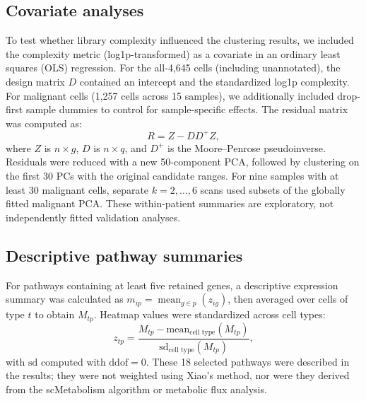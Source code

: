 \subsection{Covariate analyses}
To test whether library complexity influenced the clustering results, we included the complexity metric (log1p-transformed) as a covariate in an ordinary least squares (OLS) regression. For the all-4,645 cells (including unannotated), the design matrix $D$ contained an intercept and the standardized log1p complexity. For malignant cells (1,257 cells across 15 samples), we additionally included drop-first sample dummies to control for sample-specific effects. The residual matrix was computed as:
\begin{equation}
R = Z - D D^{+} Z,
\end{equation}
where $Z$ is $n\times g$, $D$ is $n\times q$, and $D^{+}$ is the Moore--Penrose pseudoinverse. Residuals were reduced with a new 50-component PCA, followed by clustering on the first 30 PCs with the original candidate ranges. For nine samples with at least 30 malignant cells, separate $k=2,\ldots,6$ scans used subsets of the globally fitted malignant PCA. These within-patient summaries are exploratory, not independently fitted validation analyses.

\subsection{Descriptive pathway summaries}
For pathways containing at least five retained genes, a descriptive expression summary was calculated as $m_{ip}=\operatorname{mean}_{g\in p}(z_{ig})$, then averaged over cells of type $t$ to obtain $M_{tp}$. Heatmap values were standardized across cell types:
\begin{equation}
z_{tp} = \frac{M_{tp} - \text{mean}_{\text{cell type}}(M_{tp})}{\text{sd}_{\text{cell type}}(M_{tp})},
\end{equation}
with $\text{sd}$ computed with $\text{ddof}=0$. These 18 selected pathways were described in the results; they were not weighted using Xiao's method, nor were they derived from the scMetabolism algorithm or metabolic flux analysis.

